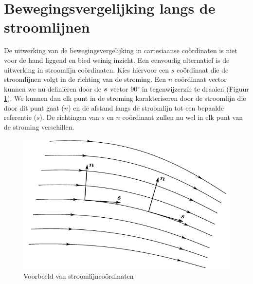 	\section{Bewegingsvergelijking langs de stroomlijnen}
	\label{sec:Bewegingsvergelijking langs de stroomlijnen}
De uitwerking van de bewegingsvergelijking in cartesiaanse coördinaten is niet voor de hand liggend en bied weinig inzicht. Een eenvoudig alternatief is de uitwerking in stroomlijn coördinaten. Kies hiervoor een $s$ coördinaat die de stroomlijnen volgt in de richting van de stroming. Een $n$ coördinaat vector kunnen we nu definiëren door de $\boldsymbol{s}$ vector 90$^\circ$ in tegenwijzerzin te draaien (Figuur \ref{fig:stroomlijncoordinaten}). We kunnen dan elk punt in de stroming karakteriseren door de stroomlijn die door dit punt gaat ($n$) en de afstand langs de stroomlijn tot een bepaalde referentie ($s$). De richtingen van $s$ en $n$ coördinaat zullen nu wel in elk punt van de stroming verschillen. 
\begin{figure}[htb]
	\centering
	\includegraphics{fig/deeltjesvergelijkingen/Stoomlijncoordinaten}
	\caption{Voorbeeld van stroomlijncoördinaten}
	\label{fig:stroomlijncoordinaten}
\end{figure}

